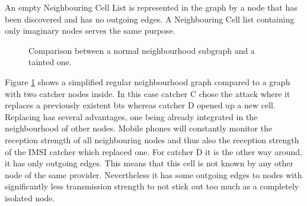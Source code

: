 An empty Neighbouring Cell List is represented in the graph by a node that has been discovered and has no outgoing edges.
A Neighbouring Cell list containing only imaginary nodes serves the same purpose.
\begin{figure}
\centering
{}
\caption{Comparison between a normal neighbourhood subgraph and a tainted one.}
\label{fig:structure_comparison}
\end{figure}
Figure \ref{fig:structure_comparison} shows a simplified regular neighbourhood graph compared to a graph with two catcher nodes inside.
In this case catcher C chose the attack where it replaces a previously existent \gls{bts} whereas catcher D opened up a new cell.
Replacing has several advantages, one being already integrated in the neighbourhood of other nodes.
Mobile phones will constantly monitor the reception strength of all neighbouring nodes and thus also the reception strength of the IMSI catcher which replaced one.
For catcher D it is the other way around, it has only outgoing edges.
This means that this cell is not known by any other node of the same provider.
Nevertheless it has some outgoing edges to nodes with significantly less transmission strength to not stick out too much as a completely isolated node.
